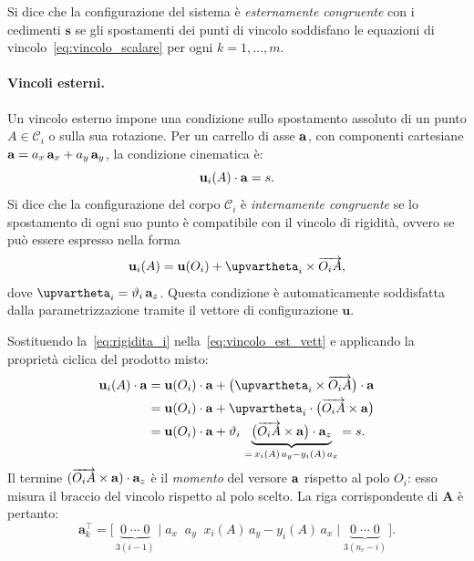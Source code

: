 Si dice che la configurazione del sistema è
\emph{esternamente congruente} con i cedimenti
$\bm{s}$ se gli spostamenti dei punti di vincolo
soddisfano le equazioni di vincolo~\eqref{eq:vincolo_scalare}
per ogni $k = 1, \dots, m$.

\paragraph{Vincoli esterni.}
Un vincolo esterno impone una condizione sullo spostamento
assoluto di un punto $A \in \mathcal{C}_i$ o sulla sua
rotazione. Per un carrello di asse $\mathbf{a}$, con componenti
cartesiane $\mathbf{a} = a_x\,\mathbf{a}_x + a_y\,\mathbf{a}_y$, la condizione
cinematica è:
\begin{equation}\label{eq:vincolo_est_vett}
	\mathbf{u}_i(A) \cdot \mathbf{a} = s.
\end{equation}
Si dice che la configurazione del corpo $\mathcal{C}_i$ è
\emph{internamente congruente} se lo spostamento di ogni
suo punto è compatibile con il vincolo di rigidità,
ovvero se può essere espresso nella forma
\begin{equation}\label{eq:rigidita_i}
	\ub_i(A) = \ub(O_i) + \bm{\upvartheta}_i \times
	\overrightarrow{O_i A},
\end{equation}
dove $\bm{\upvartheta}_i = \vartheta_i\,\ab_z$.
Questa condizione è automaticamente soddisfatta dalla
parametrizzazione tramite il vettore di configurazione
$\bm{u}$.

Sostituendo la~\eqref{eq:rigidita_i} nella~\eqref{eq:vincolo_est_vett}
e applicando la proprietà ciclica del prodotto misto:
\begin{align}\label{eq:vincolo_est_scal_cin}
	\ub_i(A) \cdot \ab
	&= \ub(O_i)\cdot\ab
	+ \bigl(\bm{\upvartheta}_i \times \overrightarrow{O_i A}
	\bigr)\cdot\ab \notag\\
	&= \ub(O_i)\cdot\ab
	+ \bm{\upvartheta}_i \cdot
	\bigl(\overrightarrow{O_i A} \times \ab\bigr) \notag\\
	&= \ub(O_i)\cdot\ab
	+ \vartheta_i\,
	\underbrace{\bigl(\overrightarrow{O_i A}
		\times \ab\bigr)\cdot\ab_z}_{
		=\,x_i(A)\,a_y - y_i(A)\,a_x}
	= s.
\end{align}
Il termine $(\overrightarrow{O_i A}\times\mathbf{a})\cdot\mathbf{a}_z$
è il \emph{momento} del versore $\mathbf{a}$ rispetto al polo
$O_i$: esso misura il braccio del vincolo rispetto al polo
scelto. La riga corrispondente di $\bm{A}$ è pertanto:
\begin{equation}\label{eq:ak_esterno}
	\bm{a}_k^{\top} =
	\bigl[\,\underbrace{0 \;\cdots\; 0}_{3(i-1)}
	\;\Big|\;
	a_x \;\; a_y \;\;
	x_i(A)\,a_y - y_i(A)\,a_x
	\;\Big|\;
	\underbrace{0 \;\cdots\; 0}_{3(n_c - i)}\,\bigr].
\end{equation}

